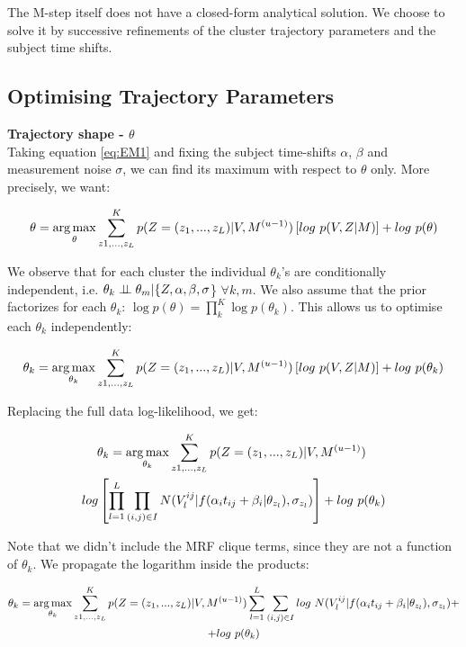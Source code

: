 The M-step itself does not have a closed-form analytical solution. We choose to solve it by successive refinements of the cluster trajectory parameters and the subject time shifts. 

\subsection{Optimising Trajectory Parameters}


\textbf{Trajectory shape - $\theta$}\\

Taking equation \ref{eq:EM1} and fixing the subject time-shifts $\alpha$, $\beta$ and measurement noise $\sigma$, we can find its maximum with respect to $\theta$ only. More precisely, we want:

\begin{equation}
 \theta = \operatorname*{arg\,max}_{\theta} \sum_{z1,\dots, z_L}^K p(Z = (z_1, ..., z_L) | V, M^{(u-1)}) \left[ log\ p(V,Z|M) \right] + log\ p(\theta)
\end{equation}

We observe that for each cluster the individual $\theta_k$'s are conditionally independent, i.e. $\theta_k \perp\!\!\!\perp \theta_m | \{Z, \alpha, \beta, \sigma$\} $\forall k,m$. We also assume that the prior factorizes for each $\theta_k$: $\log p(\theta) = \prod_k^K \log p(\theta_k)$. This allows us to optimise each $\theta_k$ independently:

\begin{equation}
 \theta_k = \operatorname*{arg\,max}_{\theta_k} \sum_{z1,\dots, z_L}^K p(Z = (z_1, ..., z_L) | V, M^{(u-1)}) \left[ log\ p(V,Z|M) \right] + log\ p(\theta_k)
\end{equation}

Replacing the full data log-likelihood, we get:

\begin{multline}
 \theta_k = \operatorname*{arg\,max}_{\theta_k} \sum_{z1,\dots, z_L}^K p(Z = (z_1, ..., z_L) | V, M^{(u-1)})\ \\ log \left[ \prod_{l=1}^L \prod_{(i,j) \in I} N(V_l^{ij} | f(\alpha_i t_{ij} + \beta_i | \theta_{z_l}), \sigma_{z_l}) \right]  + log\ p(\theta_k)
\end{multline}

Note that we didn't include the MRF clique terms, since they are not a function of $\theta_k$. We propagate the logarithm inside the products:

\begin{multline}
 \theta_k = \argmax_{\theta_k} \sum_{z1,\dots, z_L}^K p(Z = (z_1, ..., z_L) | V, \Mu^{(u-1)}) \sum_{l=1}^L \sum_{(i,j) \in I} log\ N(V_l^{ij} | f(\alpha_i t_{ij} + \beta_i | \theta_{z_l}), \sigma_{z_l}) + \\ + log\ p(\theta_k)
\end{multline}

